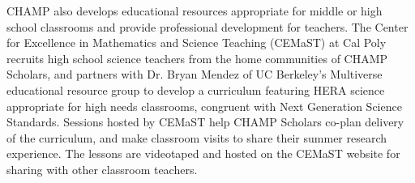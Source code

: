 \documentclass[preprint,11pt]{aastex}
\begin{document}
CHAMP also develops
educational resources appropriate for middle or high school classrooms and
provide professional development for teachers.  The Center for Excellence in Mathematics and Science Teaching (CEMaST) at Cal Poly
recruits high school science teachers from the home communities of CHAMP Scholars, and partners
with Dr. Bryan Mendez of UC Berkeley's Multiverse educational resource group 
to 
develop a curriculum featuring HERA science appropriate for high needs classrooms, congruent with
Next Generation Science Standards. Sessions hosted by CEMaST help CHAMP Scholars 
co-plan delivery of the curriculum, and
make classroom visits to share their summer research experience.
The lessons are videotaped and hosted on the CEMaST website for sharing with other classroom teachers.
\end{document}

